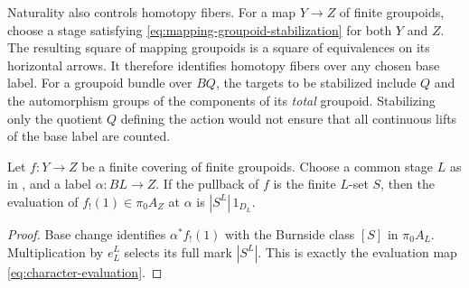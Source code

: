 Naturality also controls homotopy fibers. For a map $Y\to Z$ of finite
groupoids, choose a stage satisfying
\eqref{eq:mapping-groupoid-stabilization} for both $Y$ and $Z$.
The resulting square of mapping groupoids is a square of equivalences
on its horizontal arrows.  It therefore identifies homotopy fibers
over any chosen base label.  For a groupoid bundle over $BQ$, the
targets to be stabilized include $Q$ and the automorphism groups of
the components of its \emph{total} groupoid.  Stabilizing only the
quotient $Q$ defining the action would not ensure that all continuous
lifts of the base label are counted.

\begin{lemma}\label{lem:cover-evaluation}
Let $f:Y\to Z$ be a finite covering of finite groupoids.  Choose a
common stage $L$ as in , and a label
$\alpha:BL\to Z$.  If the pullback of $f$ is the finite $L$-set $S$,
then the evaluation of $f_!(1)\in\pi_0 A_Z$ at $\alpha$ is
$|S^L|\,1_{D_L}$.
\end{lemma}
\begin{proof}
Base change identifies $\alpha^*f_!(1)$ with the Burnside class $[S]$
in $\pi_0 A_L$.  Multiplication by $e_L^L$ selects its full mark
$|S^L|$.  This is exactly the evaluation map
\eqref{eq:character-evaluation}.
\end{proof}

